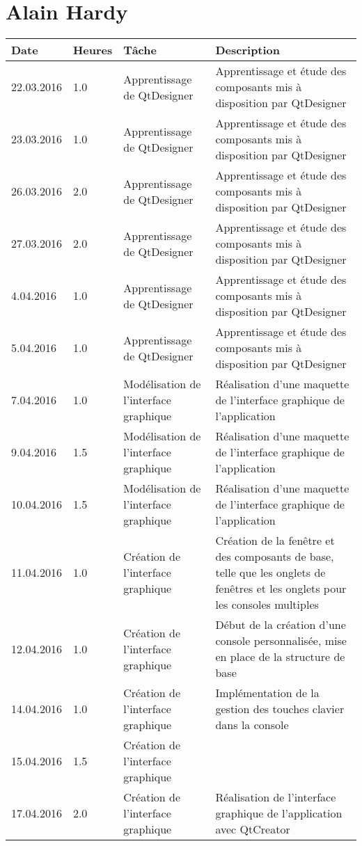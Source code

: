 \documentclass[french]{article}
\begin{document}
	\section*{Alain Hardy}
	\begin{longtable}{p{}|p{}|p{}|p{}}
		Date&Heures&Tâche&Description\\
		\hline\hline
		22.03.2016 & 1.0 & Apprentissage de QtDesigner & Apprentissage et étude des composants mis à disposition par QtDesigner\\
		23.03.2016 & 1.0 & Apprentissage de QtDesigner & Apprentissage et étude des composants mis à disposition par QtDesigner\\
		26.03.2016 & 2.0 & Apprentissage de QtDesigner & Apprentissage et étude des composants mis à disposition par QtDesigner\\
		27.03.2016 & 2.0 & Apprentissage de QtDesigner & Apprentissage et étude des composants mis à disposition par QtDesigner\\
		\hline
		4.04.2016 & 1.0 & Apprentissage de QtDesigner & Apprentissage et étude des composants mis à disposition par QtDesigner\\
		5.04.2016 & 1.0 & Apprentissage de QtDesigner & Apprentissage et étude des composants mis à disposition par QtDesigner\\
		7.04.2016 & 1.0 & Modélisation de l'interface graphique & Réalisation d'une maquette de l'interface graphique de l'application\\
		9.04.2016 & 1.5 & Modélisation de l'interface graphique & Réalisation d'une maquette de l'interface graphique de l'application\\
		10.04.2016 & 1.5 & Modélisation de l'interface graphique & Réalisation d'une maquette de l'interface graphique de l'application\\
		\hline
		11.04.2016 & 1.0 & Création de l'interface graphique & Création de la fenêtre et des composants de base, telle que les onglets de fenêtres et les onglets pour les consoles multiples\\
		12.04.2016 & 1.0 & Création de l'interface graphique & Début de la création d'une console personnalisée, mise en place de la structure de base\\
		14.04.2016 & 1.0 & Création de l'interface graphique & Implémentation de la gestion des touches clavier dans la console\\
		15.04.2016 & 1.5 & Création de l'interface graphique & \\
		17.04.2016 & 2.0 & Création de l'interface graphique & Réalisation de l'interface graphique de l'application avec QtCreator\\

\end{longtable}
\end{document}
